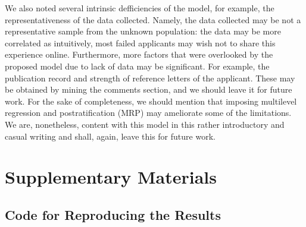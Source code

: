 \documentclass{article}
\begin{document}
    We also noted several intrinsic defficiencies of the model, for example,
    the representativeness of the data collected. Namely,
    the data collected may be not a representative sample
    from the unknown population: the data may be more correlated
    as intuitively, most failed applicants may wish not to share
    this experience online. Furthermore, more factors that were
    overlooked by the proposed model due to lack of data may be
    significant. For example, the publication record and strength of
    reference letters of the applicant. These may be obtained by mining the
    comments section, and we should leave it for future work.
    For the sake of completeness,
    we should mention that imposing multilevel
    regression and postratification (MRP) \cite{Wang:2015:MRP} may ameliorate
    some of the limitations. We are, nonetheless, content with this model
    in this rather introductory and casual writing and shall, again, leave this
    for future work.

\clearpage
{\small
\nocite{*}


}
\section*{Supplementary Materials}
\begin{appendices}
\section{Code for Reproducing the Results}
    
    
    
    
\end{appendices}
\end{document}

